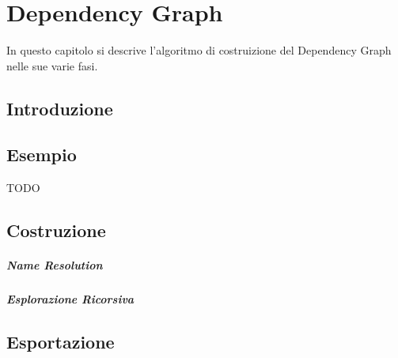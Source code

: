 \chapter{Dependency Graph}

In questo capitolo si descrive l'algoritmo di costruizione del Dependency Graph nelle sue varie fasi.

\section{Introduzione}

\section{Esempio}
TODO

\section{Costruzione}

\paragraph{Name Resolution}

\paragraph{Esplorazione Ricorsiva}

\section{Esportazione}
